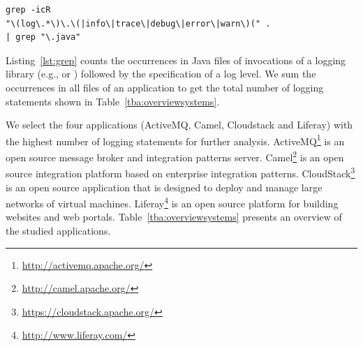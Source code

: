 \vspace{-5mm}
\begin{Code}
\begin{lstlisting}[caption={Counting logging statements}, label={lst:grep}]
grep -icR 
"\(log\.*\)\.\(|info\|trace\|debug\|error\|warn\)(" . 
| grep "\.java"
\end{lstlisting}
\end{Code}
\vspace{-5mm}

Listing~\ref{lst:grep} counts the occurrences in Java files of invocations of a logging library (e.g.,  or ) followed by the specification of a log level. We sum the occurrences in all files of an application to get the total number of logging statements shown in Table~\ref{tba:overviewsystems}.
 
We select the four applications (ActiveMQ, Camel, Cloudstack and Liferay) with the highest number of logging statements for further analysis. ActiveMQ\footnote{\url{http://activemq.apache.org/}} is an open source message broker and integration patterns server. Camel\footnote{\url{http://camel.apache.org/}} is an open source integration platform based on enterprise integration patterns. CloudStack\footnote{\url{https://cloudstack.apache.org/}} is an open source application that is designed to deploy and manage large networks of virtual machines. Liferay\footnote{\url{http://www.liferay.com/}} is an open source platform for building websites and web portals. Table~\ref{tba:overviewsystems} presents an overview of the studied applications. %


